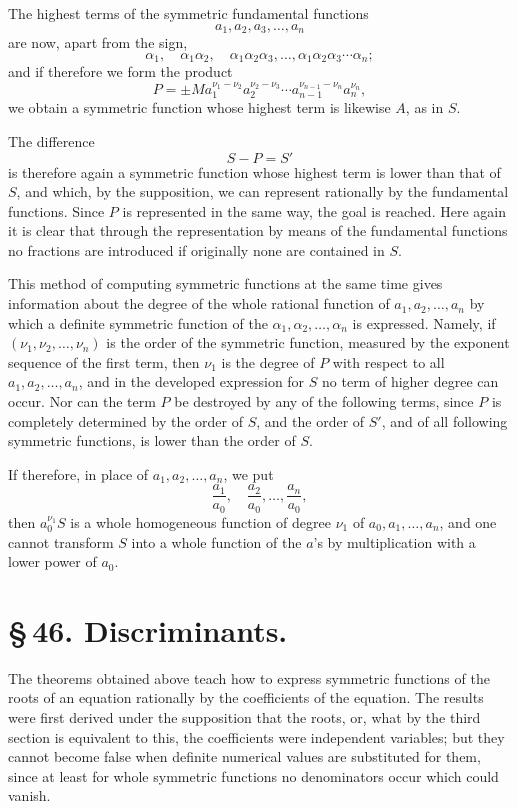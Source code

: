 \documentclass[11pt]{article}
\begin{document}
The highest terms of the symmetric fundamental functions
\[
 a_1,a_2,a_3,\ldots,a_n
\]
are now, apart from the sign,
\[
 \alpha_1,\quad \alpha_1\alpha_2,\quad \alpha_1\alpha_2\alpha_3,\ldots,\alpha_1\alpha_2\alpha_3\cdots\alpha_n;
\]
and if therefore we form the product
\[
 P=\pm M a_1^{\nu_1-\nu_2}a_2^{\nu_2-\nu_3}\cdots a_{n-1}^{\nu_{n-1}-\nu_n}a_n^{\nu_n},
\]
we obtain a symmetric function whose highest term is likewise \(A\), as in \(S\).

The difference
\[
 S-P=S'
\]
is therefore again a symmetric function whose highest term is lower than that of \(S\), and which, by the supposition, we can represent rationally by the fundamental functions. Since \(P\) is represented in the same way, the goal is reached. Here again it is clear that through the representation by means of the fundamental functions no fractions are introduced if originally none are contained in \(S\).

This method of computing symmetric functions at the same time gives information about the degree of the whole rational function of \(a_1,a_2,\ldots,a_n\) by which a definite symmetric function of the \(\alpha_1,\alpha_2,\ldots,\alpha_n\) is expressed. Namely, if \((\nu_1,\nu_2,\ldots,\nu_n)\) is the order of the symmetric function, measured by the exponent sequence of the first term, then \(\nu_1\) is the degree of \(P\) with respect to all \(a_1,a_2,\ldots,a_n\), and in the developed expression for \(S\) no term of higher degree can occur. Nor can the term \(P\) be destroyed by any of the following terms, since \(P\) is completely determined by the order of \(S\), and the order of \(S'\), and of all following symmetric functions, is lower than the order of \(S\).

If therefore, in place of \(a_1,a_2,\ldots,a_n\), we put
\[
 \frac{a_1}{a_0},\quad \frac{a_2}{a_0},\ldots,\frac{a_n}{a_0},
\]
then \(a_0^{\nu_1}S\) is a whole homogeneous function of degree \(\nu_1\) of \(a_0,a_1,\ldots,a_n\), and one cannot transform \(S\) into a whole function of the \(a\)'s by multiplication with a lower power of \(a_0\).

\section*{\S\,46. Discriminants.}

The theorems obtained above teach how to express symmetric functions of the roots of an equation rationally by the coefficients of the equation. The results were first derived under the supposition that the roots, or, what by the third section is equivalent to this, the coefficients were independent variables; but they cannot become false when definite numerical values are substituted for them, since at least for whole symmetric functions no denominators occur which could vanish.
\end{document}
